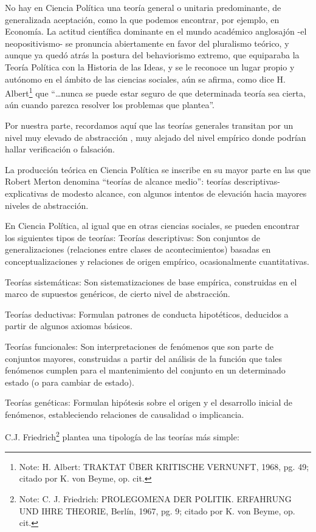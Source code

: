 \documentclass[
]{book}
\begin{document}
No hay en Ciencia Política una teoría general o unitaria predominante, de generalizada aceptación, como la que podemos encontrar, por ejemplo, en Economía. La actitud científica dominante en el mundo académico anglosajón -el neopositivismo- se pronuncia abiertamente en favor del pluralismo teórico, y aunque ya quedó atrás la postura del behaviorismo extremo, que equiparaba la Teoría Política con la Historia de las Ideas, y se le reconoce un lugar propio y autónomo en el ámbito de las ciencias sociales, aún se afirma, como dice H. Albert\footnote{Note: H. Albert: TRAKTAT ÜBER KRITISCHE VERNUNFT, 1968, pg. 49; citado por K. von Beyme, op. cit.} que ``\ldots nunca se puede estar seguro de que determinada teoría sea cierta, aún cuando parezca resolver los problemas que plantea''.

Por nuestra parte, recordamos aquí que las teorías generales transitan por un nivel muy elevado de abstracción , muy alejado del nivel empírico donde podrían hallar verificación o falsación.

La producción teórica en Ciencia Política se inscribe en su mayor parte en las que Robert Merton denomina ``teorías de alcance medio'': teorías descriptivas-explicativas de modesto alcance, con algunos intentos de elevación hacia mayores niveles de abstracción.

En Ciencia Política, al igual que en otras ciencias sociales, se pueden encontrar los siguientes tipos de teorías: Teorías descriptivas: Son conjuntos de generalizaciones (relaciones entre clases de acontecimientos) basadas en conceptualizaciones y relaciones de origen empírico, ocasionalmente cuantitativas.

Teorías sistemáticas: Son sistematizaciones de base empírica, construidas en el marco de supuestos genéricos, de cierto nivel de abstracción.

Teorías deductivas: Formulan patrones de conducta hipotéticos, deducidos a partir de algunos axiomas básicos.

Teorías funcionales: Son interpretaciones de fenómenos que son parte de conjuntos mayores, construidas a partir del análisis de la función que tales fenómenos cumplen para el mantenimiento del conjunto en un determinado estado (o para cambiar de estado).

Teorías genéticas: Formulan hipótesis sobre el origen y el desarrollo inicial de fenómenos, estableciendo relaciones de causalidad o implicancia.

C.J. Friedrich\footnote{Note: C. J. Friedrich: PROLEGOMENA DER POLITIK. ERFAHRUNG UND IHRE THEORIE, Berlín, 1967, pg. 9; citado por K. von Beyme, op. cit.} plantea una tipología de las teorías más simple:
\end{document}
